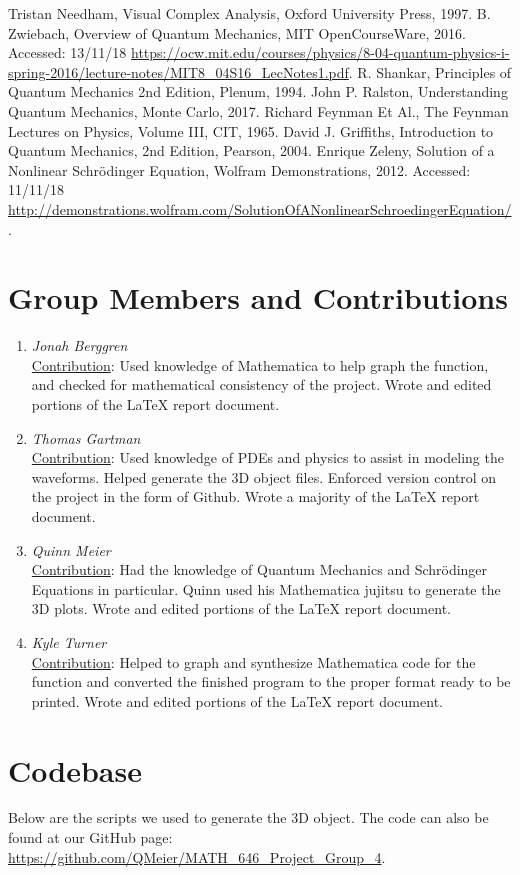 \documentclass[12pt]{article}
\begin{document}
\begin{thebibliography}{9999}
 Tristan Needham, Visual Complex Analysis, Oxford University Press, 1997.
 B. Zwiebach, Overview of Quantum Mechanics, MIT OpenCourseWare, 2016. Accessed: 13/11/18 \url{https://ocw.mit.edu/courses/physics/8-04-quantum-physics-i-spring-2016/lecture-notes/MIT8_04S16_LecNotes1.pdf}.
 R. Shankar, Principles of Quantum Mechanics 2nd Edition, Plenum, 1994. 
 John P. Ralston, Understanding Quantum Mechanics, Monte Carlo, 2017.
 Richard Feynman Et Al., The Feynman Lectures on Physics, Volume III, CIT, 1965.
 David J. Griffiths, Introduction to Quantum Mechanics, 2nd Edition, Pearson, 2004.
 Enrique Zeleny, Solution of a Nonlinear Schr\"{o}dinger Equation, Wolfram Demonstrations, 2012. Accessed: 11/11/18 \url{http://demonstrations.wolfram.com/SolutionOfANonlinearSchroedingerEquation/}.


\end{thebibliography}

\section{Group Members and Contributions}
\begin{enumerate}
\item {\em Jonah Berggren} \\
\underline{Contribution}: Used knowledge of Mathematica to help graph the function, and checked for mathematical consistency of the project. Wrote and edited portions of the LaTeX report document.\\
\item {\em Thomas Gartman} \\
\underline{Contribution}: Used knowledge of PDEs and physics to assist in modeling the waveforms. Helped generate the 3D object files. Enforced version control on the project in the form of Github. Wrote a majority of the LaTeX report document. \\
\item {\em Quinn Meier} \\
\underline{Contribution}: Had the knowledge of Quantum Mechanics and Schr\"{o}dinger Equations in particular. Quinn used his Mathematica jujitsu to generate the 3D plots. Wrote and edited portions of the LaTeX report document. \\
\item {\em Kyle Turner} \\
\underline{Contribution}: Helped to graph and synthesize Mathematica code for the function and converted the finished program to the proper format ready to be printed. Wrote and edited portions of the LaTeX report document.   \\

\end{enumerate}


\appendix
\section{Codebase}\label{code}

Below are the scripts we used to generate the 3D object. The code can also be found at our GitHub page: \url{https://github.com/QMeier/MATH_646_Project_Group_4}.
\end{document}
